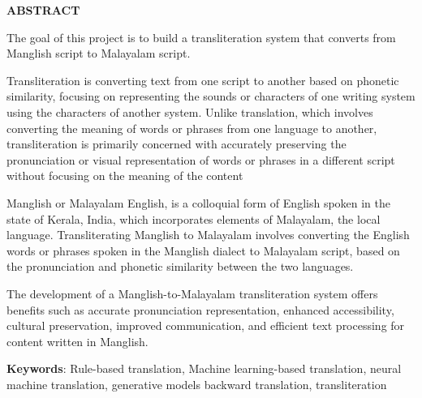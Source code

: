 \thispagestyle{plain}
\begin{center}
    \Large \bfseries  {ABSTRACT} \\[1cm]
\end{center}

\vspace{2\baselineskip}

\noindent
\par The goal of this project is to build a transliteration system that converts from Manglish script to Malayalam script. 

\par Transliteration is converting text from one script to another based on phonetic similarity, focusing on representing the sounds or characters of one writing system using the characters of another system. Unlike translation, which involves converting the meaning of words or phrases from one language to another, transliteration is primarily concerned with accurately preserving the pronunciation or visual representation of words or phrases in a different script without focusing on the meaning of the content

\par Manglish or Malayalam English, is a colloquial form of English spoken in the state of Kerala, India, which incorporates elements of Malayalam, the local language. Transliterating Manglish to Malayalam involves converting the English words or phrases spoken in the Manglish dialect to Malayalam script, based on the pronunciation and phonetic similarity between the two languages.

\par The development of a Manglish-to-Malayalam transliteration system offers benefits such as accurate pronunciation representation, enhanced accessibility, cultural preservation, improved communication, and efficient text processing for content written in Manglish.

\vspace{2\baselineskip}

\noindent
\textbf{Keywords}: Rule-based translation, Machine learning-based translation, neural machine translation, generative models backward translation, transliteration